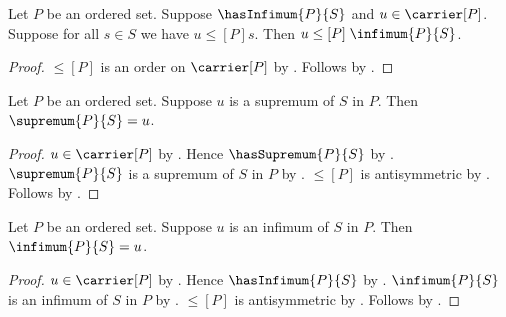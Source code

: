 \begin{proposition}\label{infimum_greatest}
    Let $P$ be an ordered set.
    Suppose $\hasInfimum{P}{S}$ and $u\in\carrier[P]$.
    Suppose for all $s\in S$ we have $u\mathrel{\leq[P]}s$.
    Then $u\mathrel{\leq[P]}\infimum{P}{S}$.
\end{proposition}
\begin{proof}
    $\leq[P]$ is an order on $\carrier[P]$ by
        .
    Follows by
        .
\end{proof}

\begin{proposition}\label{supremum_eq_of_is_supremum}
    Let $P$ be an ordered set.
    Suppose $u$ is a supremum of $S$ in $P$.
    Then $\supremum{P}{S}=u$.
\end{proposition}
\begin{proof}
    $u\in\carrier[P]$ by
        .
    Hence $\hasSupremum{P}{S}$ by .
    $\supremum{P}{S}$ is a supremum of $S$ in $P$ by
        .
    $\leq[P]$ is antisymmetric by
        .
    Follows by .
\end{proof}

\begin{proposition}\label{infimum_eq_of_is_infimum}
    Let $P$ be an ordered set.
    Suppose $u$ is an infimum of $S$ in $P$.
    Then $\infimum{P}{S}=u$.
\end{proposition}
\begin{proof}
    $u\in\carrier[P]$ by
        .
    Hence $\hasInfimum{P}{S}$ by .
    $\infimum{P}{S}$ is an infimum of $S$ in $P$ by
        .
    $\leq[P]$ is antisymmetric by
        .
    Follows by .
\end{proof}

